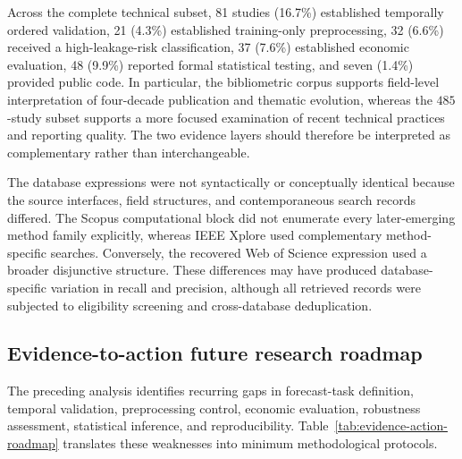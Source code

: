 \documentclass[pdflatex,sn-mathphys-num]{sn-jnl}%
\theoremstyle{thmstyleone}%
\theoremstyle{thmstyletwo}%
\theoremstyle{thmstylethree}%
\begin{document}
Across the complete technical subset, 81 studies (16.7\%) established
temporally ordered validation, 21 (4.3\%) established training-only
preprocessing, 32 (6.6\%) received a high-leakage-risk classification,
37 (7.6\%) established economic evaluation, 48 (9.9\%) reported formal
statistical testing, and seven (1.4\%) provided public code. In particular,
the bibliometric corpus supports field-level interpretation of
four-decade publication and thematic evolution, whereas the
\(485\)-study subset supports a more focused examination of recent
technical practices and reporting quality. The two evidence layers
should therefore be interpreted as complementary rather than
interchangeable.

The database expressions were not syntactically or conceptually
identical because the source interfaces, field structures, and
contemporaneous search records differed. The Scopus computational
block did not enumerate every later-emerging method family explicitly,
whereas IEEE Xplore used complementary
method-specific searches. Conversely, the recovered Web of Science
expression used a broader disjunctive structure. These differences may
have produced database-specific variation in recall and precision,
although all retrieved records were subjected to eligibility screening
and cross-database deduplication.
\subsection{Evidence-to-action future research roadmap}
\label{subsec:future-roadmap}
The preceding analysis identifies recurring gaps in forecast-task
definition, temporal validation, preprocessing control, economic
evaluation, robustness assessment, statistical inference, and
reproducibility. Table~\ref{tab:evidence-action-roadmap} translates
these weaknesses into minimum methodological protocols.
\FloatBarrier
\end{document}
